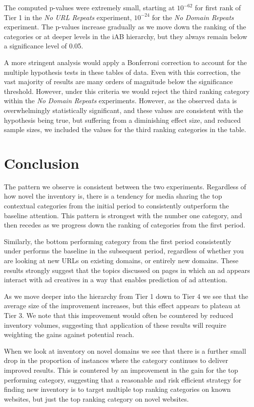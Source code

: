\documentclass[sigconf]{acmart}
\begin{document}
The computed p-values were extremely small, starting at $10^{-62}$ for first rank of Tier 1 in
the \emph{No URL Repeats} experiment, $10^{-24}$ for the \emph{No Domain Repeats} experiment.
The p-values increase gradually as we move down the ranking of the categories or at deeper
levels in the iAB hierarchy, but they always remain below a significance level
of 0.05.

A more stringent analysis would apply a Bonferroni correction to account for the multiple
hypothesis tests in these tables of data. Even with this correction, the vast majority
of results
are many orders of magnitude below the significance threshold. However, under this criteria
we would reject the third ranking category within the \emph{No Domain Repeats} experiments.
However, as the observed data is overwhelmingly statistically significant, and these values
are consistent with the hypothesis being true, but suffering from a diminishing effect size,
and reduced sample sizes, we included the values for the third ranking categories in the
table.

\section{Conclusion}
The pattern we observe is consistent between the two experiments. Regardless of
how novel the inventory is, there is a tendency for media sharing the top contextual
categories from the
initial period to consistently outperform the baseline attention.
This pattern is strongest with the number one category, and then recedes
as we progress down the ranking of categories from the first period.

Similarly, the bottom performing category from the first period consistently under performs
the baseline in the subsequent period, regardless of whether you are looking at new URLs
on existing domains, or entirely new domains.
These results strongly suggest that the topics discussed on pages in which an ad appears
interact with ad creatives in a way that enables prediction of ad attention.

As we move deeper into the hierarchy from Tier 1 down to Tier 4 we see that the average size
of the improvement increases, but this effect appears to plateau at Tier 3. We note that this
improvement would often be countered by reduced inventory volumes, suggesting that application
of these results will require weighting the gains against potential reach.

When we look at inventory on novel domains we see that there is a further small drop in the
proportion of instances where the category continues to deliver improved results. This is
countered by an improvement in the gain for the top performing category, suggesting that a
reasonable and risk efficient strategy for finding new inventory is to target multiple top
ranking categories on known websites, but just the top ranking category on novel websites.
\end{document}
